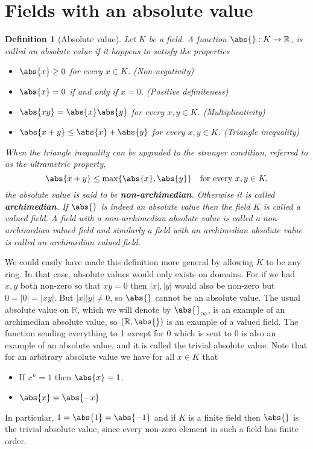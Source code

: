 \documentclass{article}
\newtheorem{definition}{Definition}[section]
\newcommand{\mbb}[1]{\mathbb{#1}}
\numberwithin{equation}{section}
\begin{document}
\section{Fields with an absolute value}

\begin{definition}[Absolute value]
    Let $K$ be a field. A function $\abs{} : K \to \mbb R$, is called an absolute value if it happens to satisfy the properties
    \begin{itemize}
        \item $\abs{x} \geq 0$ for every $x \in K$. (Non-negativity)
        \item $\abs{x} = 0$ if and only if $x = 0$. (Positive definiteness)
        \item $\abs{xy} = \abs{x} \abs{y}$ for every $x,y \in K$. (Multiplicativity)
        \item $\abs{x + y} \leq \abs{x} + \abs{y}$ for every $x,y \in K$. (Triangle inequality)
    \end{itemize}
    When the triangle inequality can be upgraded to the stronger condition, referred to as the ultrametric property,  $$\abs{x + y} \leq \max \{\abs{x}, \abs{y}\} \quad \text{for every } x,y \in K,$$
    the absolute value is said to be \textbf{non-archimedian}. Otherwise it is called \textbf{archimedian}. If $\abs{}$ is indeed an absolute value then the field $K$ is called a valued field. A field with a non-archimedian absolute value is called a non-archimedian valued field and similarly a field with an archimedian absolute value is called an archimedian valued field.
\end{definition}
We could easily have made this definition more general by allowing $K$ to be any ring. In that case, absolute values would only exists on domains. For if we had $x,y$ both non-zero so that $xy = 0$ then $|x|, |y|$ would also be non-zero but $0 = |0| = |xy|$. But $|x||y| \neq 0$, so $\abs{}$ cannot be an absolute value. The usual absolute value on $\mbb R$, which we will denote by $\abs{}_\infty$,  is an example of an archimedian absolute value, so $(\mbb R, \abs{})$ is an example of a valued field. The function sending everything to 1 except for 0 which is sent to 0 is also an example of an absolute value, and it is called the trivial absolute value. Note that for an arbitrary absolute value we have for all $x \in K$ that
\begin{itemize}
    \item If $x^n = 1$ then $\abs{x} = 1$.
    \item $\abs{x} = \abs{-x}$
\end{itemize}
In particular, $1 = \abs{1} = \abs{-1}$ and if $K$ is a finite field then $\abs{}$ is the trivial absolute value, since every non-zero element in such a field has finite order.
\end{document}
